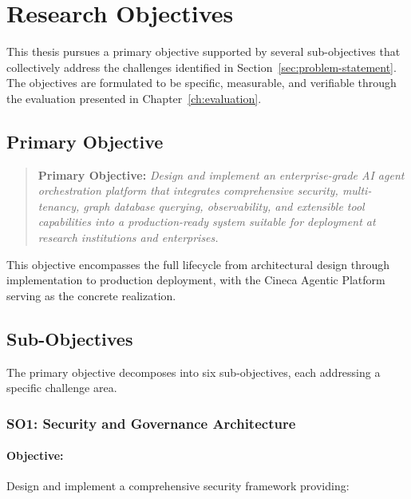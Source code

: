 
\section{Research Objectives}
\label{sec:objectives}

This thesis pursues a primary objective supported by several sub-objectives that collectively address the challenges identified in Section~\ref{sec:problem-statement}. The objectives are formulated to be specific, measurable, and verifiable through the evaluation presented in Chapter~\ref{ch:evaluation}.

\subsection{Primary Objective}

\begin{quote}
\textbf{Primary Objective:} \emph{Design and implement an enterprise-grade AI agent orchestration platform that integrates comprehensive security, multi-tenancy, graph database querying, observability, and extensible tool capabilities into a production-ready system suitable for deployment at research institutions and enterprises.}
\end{quote}

This objective encompasses the full lifecycle from architectural design through implementation to production deployment, with the Cineca Agentic Platform serving as the concrete realization.

\subsection{Sub-Objectives}

The primary objective decomposes into six sub-objectives, each addressing a specific challenge area.

\subsubsection{SO1: Security and Governance Architecture}

\paragraph{Objective:} Design and implement a comprehensive security framework providing:

